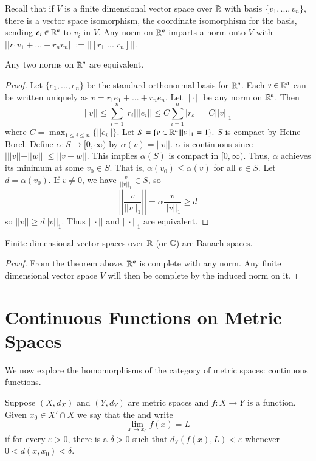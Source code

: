 Recall that if $V$ is a finite dimensional vector space over $\mathbb R$ with basis $\{v_1,...,v_n\}$, there is a vector space isomorphism, the coordinate isomorphism for the basis, sending $e_i \in \mathbb R^n$ to $v_i$ in $V$. Any norm on $\mathbb R^n$ imparts a norm onto $V$ with $||r_1v_1+...+r_nv_n|| := ||[r_1\;...\;r_n]||$.

\begin{theorem}
    Any two norms on $\mathbb R^n$ are equivalent.
\end{theorem}
\begin{proof}
    Let $\{e_1,...,e_n\}$ be the standard orthonormal basis for $\mathbb R^n$. Each $v \in \mathbb R^n$ can be written uniquely as $v = r_1e_1+...+r_ne_n$. Let $||\cdot||$ be any norm on $\mathbb R^n$. Then $$||v|| \leq \sum_{i=1}^n|r_i|||e_i|| \leq C\sum_{i=1}^n|r_o| = C||v||_1$$ where $C = \max_{1\leq i \leq n}\{||e_i||\}$. Let $S = \{v \in \mathbb R^n\vert ||v||_1 = 1\}$. $S$ is compact by Heine-Borel. Define $\alpha:S\rightarrow [0,\infty)$ by $\alpha(v) = ||v||$. $\alpha$ is continuous since $|||v|| - ||w||| \leq ||v-w||$. This implies $\alpha(S)$ is compact in $[0,\infty)$. Thus, $\alpha$ achieves its minimum at some $v_0 \in S$. That is, $\alpha(v_0) \leq \alpha(v)$ for all $v \in S$. Let $d = \alpha(v_0)$. If $v \neq 0$, we have $\frac{v}{||v||_1} \in S$, so $$\left|\left|\frac{v}{||v||_1}\right|\right| = \alpha\frac{v}{||v||_1} \geq d$$ so $||v|| \geq d||v||_1$. Thus $||\cdot||$ and $||\cdot||_1$ are equivalent.
\end{proof}

\begin{corollary}
    Finite dimensional vector spaces over $\mathbb R$ (or $\mathbb C$) are Banach spaces.
\end{corollary}
\begin{proof}
    From the theorem above, $\mathbb R^n$ is complete with any norm. Any finite dimensional vector space $V$ will then be complete by the induced norm on it.
\end{proof}




\section{Continuous Functions on Metric Spaces}

We now explore the homomorphisms of the category of metric spaces: continuous functions.

\begin{definition}
    Suppose $(X,d_X)$ and $(Y,d_Y)$ are metric spaces and $f:X\rightarrow Y$ is a function. Given $x_0 \in X'\cap X$ we say that the  and write $$\lim\limits_{x\rightarrow x_0}f(x) = L$$ if for every $\varepsilon > 0$, there is a $\delta > 0$ such that $d_Y(f(x),L) < \varepsilon$ whenever $0 < d(x,x_0) < \delta$.
\end{definition}


